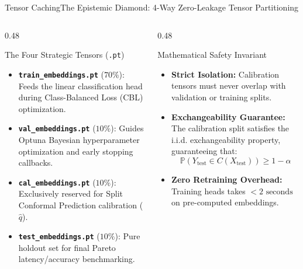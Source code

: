 \begin{frame}{Tensor Caching}{The Epistemic Diamond: 4-Way Zero-Leakage Tensor Partitioning}
    \vspace{-0.1cm}
    \begin{columns}[T]
        \begin{column}{0.48\textwidth}
            \begin{block}{The Four Strategic Tensors (\texttt{.pt})}
                \begin{itemize}\scriptsize
                    \item \textbf{\texttt{train\_embeddings.pt}} ($70\%$): Feeds the linear classification head during Class-Balanced Loss (CBL) optimization.
                    \item \textbf{\texttt{val\_embeddings.pt}} ($10\%$): Guides Optuna Bayesian hyperparameter optimization and early stopping callbacks.
                    \item \textbf{\texttt{cal\_embeddings.pt}} ($10\%$): Exclusively reserved for Split Conformal Prediction calibration ($\hat{q}$).
                    \item \textbf{\texttt{test\_embeddings.pt}} ($10\%$): Pure holdout set for final Pareto latency/accuracy benchmarking.
                \end{itemize}
            \end{block}
        \end{column}
        \begin{column}{0.48\textwidth}
            \begin{block}{Mathematical Safety Invariant}
                \begin{itemize}\scriptsize
                    \item \textbf{Strict Isolation:} Calibration tensors must never overlap with validation or training splits.
                    \item \textbf{Exchangeability Guarantee:} The calibration split satisfies the i.i.d. exchangeability property, guaranteeing that:
                        $$\mathbb{P}\left(Y_{\text{test}} \in C(X_{\text{test}})\right) \ge 1 - \alpha$$
                    \item \textbf{Zero Retraining Overhead:} Training heads takes $< 2\text{ seconds}$ on pre-computed embeddings.
                \end{itemize}
            \end{block}
        \end{column}
    \end{columns}

\end{frame}

